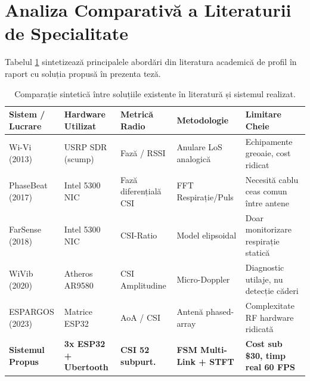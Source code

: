 \section{Analiza Comparativă a Literaturii de Specialitate}
Tabelul \ref{tab:literature_comparison} sintetizează principalele abordări din literatura academică de profil în raport cu soluția propusă în prezenta teză.

\begin{table}[H]
\centering
\small
\begin{tabular}{@{}lllll@{}}
\toprule
\textbf{Sistem / Lucrare} & \textbf{Hardware Utilizat} & \textbf{Metrică Radio} & \textbf{Metodologie} & \textbf{Limitare Cheie} \\ \midrule
Wi-Vi (2013) \cite{adib2013see} & USRP SDR (scump) & Fază / RSSI & Anulare LoS analogică & Echipamente greoaie, cost ridicat \\
PhaseBeat (2017) \cite{wang2017phasebeat} & Intel 5300 NIC & Fază diferențială CSI & FFT Respirație/Puls & Necesită cablu ceas comun între antene \\
FarSense (2018) \cite{zeng2018farsense} & Intel 5300 NIC & CSI-Ratio & Model elipsoidal & Doar monitorizare respirație statică \\
WiVib (2020) \cite{zhang2020wivib} & Atheros AR9580 & CSI Amplitudine & Micro-Doppler & Diagnostic utilaje, nu detecție căderi \\
ESPARGOS (2023) \cite{schon2023espargos} & Matrice ESP32 & AoA / CSI & Antenă phased-array & Complexitate RF hardware ridicată \\
\textbf{Sistemul Propus} & \textbf{3x ESP32 + Ubertooth} & \textbf{CSI 52 subpurt.} & \textbf{FSM Multi-Link + STFT} & \textbf{Cost sub \$30, timp real 60 FPS} \\ \bottomrule
\end{tabular}
\caption{Comparație sintetică între soluțiile existente în literatură și sistemul realizat.}
\label{tab:literature_comparison}
\end{table}
